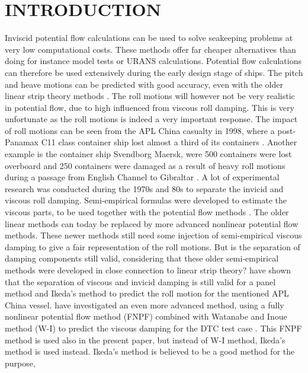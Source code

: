 \section*{INTRODUCTION}\label{introduction}
Inviscid potential flow calculations can be used to solve seakeeping
problems at very low computational costs. These methods offer far
cheaper alternatives than doing for instance model tests or URANS
calculations. Potential flow calculations can therefore be used
extensively during the early design stage of ships. The pitch and heave
motions can be predicted with good accuracy, even with the older linear
strip theory methods \citep{7505983/FB64RGPF}. The roll motions will
however not be very realistic in potential flow, due to high influenced
from viscous roll damping. This is very unfortunate as the roll motions
is indeed a very important response. The impact of roll motions can be
seen from the APL China casualty in 1998, where a post-Panamax C11 class
container ship lost almost a third of its containers
\citep{7505983/WPADAQB3}. Another example is the container ship Svendborg
Maersk, were 500 containers were lost overboard and 250 containers were
damaged as a result of heavy roll motions during a passage from English
Channel to Gibraltar \citep{7505983/T78CMTDR}.
\quad A lot of experimental research was conducted during the 1970s and
80s to separate the invicid and viscous roll damping. Semi-empirical
formulas were developed to estimate the viscous parts, to be used
together with the potential flow methods \citep{7505983/937PN5DT}. The
older linear methods can today be replaced by more advanced nonlinear
potential flow methods. These newer methods still need some injection of
semi-empirical viscous damping to give a fair representation of the roll
motions. But is the separation of damping components still valid,
considering that these older semi-empirical methods were developed in
close connection to linear strip theory? \citep{7505983/UGK6YEVD} have
shown that the separation of viscous and invicid damping is still valid
for a panel method and Ikeda's method to predict the roll motion for the
mentioned APL China vessel. \citep{7505983/24TNAV5Z} have investigated an
even more advanced method, using a fully nonlinear potential flow method
(FNPF) \citep{7505983/P4XDUMMQ} combined with Watanabe and Inoue method
(W-I) \citep{7505983/ARMIRMVY} to predict the viscous damping for the DTC
test case \citep{7505983/BYNJ8CFG}. This FNPF method is used also in the
present paper, but instead of W-I method, Ikeda's method is used
instead. Ikeda's method is believed to be a good method for the purpose,
